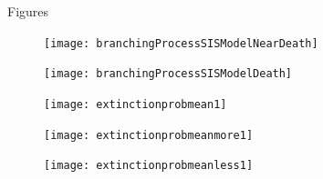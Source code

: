 \documentclass[12pt]{article}
\numberwithin{equation}{section}
\begin{document}
\begin{section}{Figures}
\begin{figure}
\centering
\texttt{[image: branchingProcessSISModelNearDeath]}
\end{figure}
\begin{figure}
\centering
\texttt{[image: branchingProcessSISModelDeath]}
\end{figure}
\begin{figure}
\centering
\texttt{[image: extinctionprobmean1]}
\end{figure}
\begin{figure}
\centering
\texttt{[image: extinctionprobmeanmore1]}
\end{figure}
\begin{figure}
\centering
\texttt{[image: extinctionprobmeanless1]}
\end{figure}    
\end{section}
\end{document}
